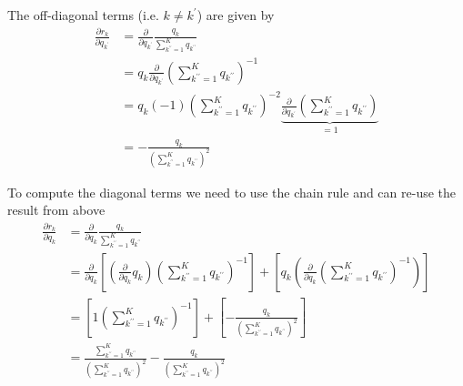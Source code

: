 \documentclass{article}
\begin{document}
The off-diagonal terms (i.e. $k \neq k^\prime$) are given by
\begin{equation}
    \begin{aligned}
        \frac{\partial r_k}{\partial q_{k^\prime}}
        &= \frac{\partial}{\partial q_{k^\prime}} \frac{{q_k}}{\sum_{k^{\prime \prime}=1}^K {q}_{k^{\prime \prime}}} \\
        &= {q_k}  \frac{\partial}{\partial q_{k^\prime}} \left(\sum_{k^{\prime \prime}=1}^K {q}_{k^{\prime \prime}} \right)^{-1} \\
        &= {q_k} (-1)\left(\sum_{k^{\prime \prime}=1}^K {q}_{k^{\prime \prime}} \right)^{-2} \underbrace{\frac{\partial}{\partial q_{k^\prime}} \left(\sum_{k^{\prime \prime}=1}^K {q}_{k^{\prime \prime}} \right)}_{=1} \\
        &= - \frac{q_k}{\left(\sum_{k^{\prime \prime}=1}^K {q}_{k^{\prime \prime}} \right)^{2}}
    \end{aligned}
\end{equation}

To compute the diagonal terms we need to use the chain rule and can re-use the result from above
\begin{equation}
    \begin{aligned}
        \frac{\partial r_k}{\partial q_{k}}
        &= \frac{\partial}{\partial q_{k}} \frac{{q_k}}{\sum_{k^{\prime \prime}=1}^K {q}_{k^{\prime \prime}}} \\
        &= \frac{\partial}{\partial q_{k}} \left[\left(\frac{\partial}{\partial q_{k}} q_k \right) \left(\sum_{k^{\prime \prime}=1}^K {q}_{k^{\prime \prime}} \right)^{-1} \right]
        + \left[ q_{k} \left(\frac{\partial}{\partial q_{k}} \left(\sum_{k^{\prime \prime}=1}^K {q}_{k^{\prime \prime}} \right)^{-1} \right) \right] \\
        &= \left[ 1 \left(\sum_{k^{\prime \prime}=1}^K {q}_{k^{\prime \prime}} \right)^{-1}\right] + \left[ - \frac{q_k}{\left(\sum_{k^{\prime \prime}=1}^K {q}_{k^{\prime \prime}} \right)^{2}} \right] \\
        &= \frac{\sum_{k^{\prime \prime}=1}^K {q}_{k^{\prime \prime}}}{\left(\sum_{k^{\prime \prime}=1}^K {q}_{k^{\prime \prime}} \right)^{2}}
        - \frac{q_k}{\left(\sum_{k^{\prime \prime}=1}^K {q}_{k^{\prime \prime}} \right)^{2}} \\
    \end{aligned}
\end{equation}
\end{document}
